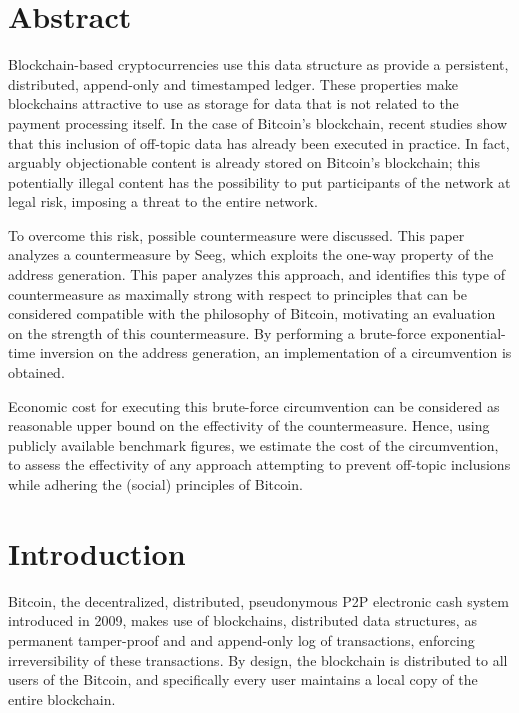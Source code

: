 \documentclass[a4paper,11pt,titlepage]{scrbook}
\newcommand{\blankpage}{
 \clearpage{\pagestyle{empty}\cleardoublepage}
}
\begin{document}
\frontmatter
{}

\setmarginsrb{3cm}{1cm}{3cm}{1cm}{6mm}{7mm}{5mm}{15mm}
\chapter*{Abstract}
Blockchain-based cryptocurrencies use this data structure as provide a persistent, distributed, append-only and timestamped ledger.
These properties make blockchains attractive to use as storage for data that is not related to the payment processing itself.
In the case of Bitcoin's blockchain, recent studies show that this inclusion of off-topic data has already been executed in practice.
In fact, arguably objectionable content is already stored on Bitcoin's blockchain;
this potentially illegal content has the possibility to put participants of the network at legal risk, imposing a threat to the entire network.

To overcome this risk, possible countermeasure were discussed. This paper analyzes a countermeasure by Seeg, which exploits the one-way property of the address generation.
This paper analyzes this approach, and identifies this type of countermeasure as maximally strong with respect to principles that can be considered compatible with the philosophy of Bitcoin, motivating an evaluation on the strength of this countermeasure.
By performing a brute-force exponential-time inversion on the address generation, an implementation of a circumvention is obtained.

Economic cost for executing this brute-force circumvention can be considered as reasonable  upper bound on the effectivity of the countermeasure.
Hence, using publicly available benchmark figures, we estimate the cost of the circumvention, to assess the effectivity of any approach attempting to prevent off-topic inclusions while adhering the (social) principles of Bitcoin.




\tableofcontents
\blankpage

\mainmatter
{}
\chapter{Introduction}

Bitcoin, the decentralized, distributed, pseudonymous P2P electronic cash system introduced in 2009, makes use of blockchains, distributed data structures, as permanent tamper-proof and and append-only log of transactions, enforcing irreversibility of these transactions.
By design, the blockchain is distributed to all users of the Bitcoin, and specifically every user maintains a local copy of the entire blockchain. \cite[Cf.][]{nakamoto_bitcoin_2008}
\end{document}
